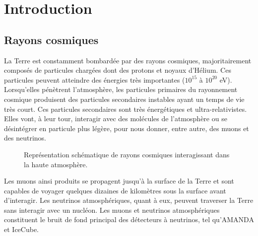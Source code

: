 \section{Introduction}

\subsection{Rayons cosmiques}
La Terre est constamment bombardée par des rayons cosmiques, majoritairement composés de particules chargées dont des protons et noyaux d'Hélium. Ces particules peuvent atteindre des énergies très importantes ($10^{15}$ à $10^{20}$ eV). Lorsqu'elles pénètrent l'atmosphère, les particules primaires du rayonnement cosmique produisent des particules secondaires instables ayant un temps de vie très court. Ces particules secondaires sont très énergétiques et ultra-relativistes. Elles vont, à leur tour, interagir avec des molécules de l'atmosphère ou se désintégrer en particule plus légère, pour nous donner, entre autre, des muons et des neutrinos.\\

\begin{figure}[h!]
    \caption{\label{fig:CR} Représentation schématique de rayons cosmiques interagissant dans la haute atmosphère.}
\end{figure}

Les muons ainsi produits se propagent jusqu'à la surface de la Terre et sont capables de voyager quelques dizaines de kilomètres sous la surface avant d'interagir. Les neutrinos atmosphériques, quant à eux, peuvent traverser la Terre sans interagir avec un nucléon. Les muons et neutrinos atmosphériques constituent le bruit de fond principal des détecteurs à neutrinos, tel qu'AMANDA et IceCube.

